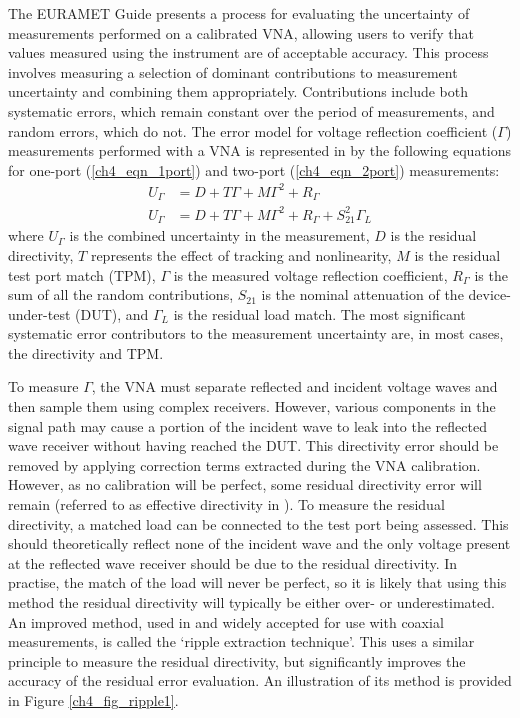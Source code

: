 \documentclass[../thesis/thesis.tex]{subfiles}
\begin{document}
The EURAMET Guide \cite{EURAMET_2011} presents a process for evaluating the uncertainty of measurements performed on a calibrated VNA, allowing users to verify that values measured using the instrument are of acceptable accuracy. This process involves measuring a selection of dominant contributions to measurement uncertainty and combining them appropriately. Contributions include both systematic errors, which remain constant over the period of measurements, and random errors, which do not.  The error model for voltage reflection coefficient ($\Gamma$) measurements performed with a VNA is represented in \cite{EURAMET_2011} by the following equations for one-port (\ref{ch4_eqn_1port}) and two-port (\ref{ch4_eqn_2port}) measurements:
\begin{align}
U_{\Gamma} &= D + T\Gamma + M\Gamma^2 + R_{\Gamma} \label{ch4_eqn_1port} \\
U_{\Gamma} &= D + T\Gamma + M\Gamma^2 + R_{\Gamma} + S_{21}^2\Gamma_L \label{ch4_eqn_2port}
\end{align}
where $U_{\Gamma}$ is the combined uncertainty in the measurement, $D$ is the residual directivity, $T$ represents the effect of tracking and nonlinearity, $M$ is the residual test port match (TPM), $\Gamma$ is the measured voltage reflection coefficient, $R_{\Gamma}$ is the sum of all the random contributions, $S_{21}$ is the nominal attenuation of the device-under-test (DUT), and $\Gamma_L$ is the residual load match. The most significant systematic error contributors to the measurement uncertainty are, in most cases, the directivity and TPM.

To measure $\Gamma$, the VNA must separate reflected and incident voltage waves and then sample them using complex receivers. However, various components in the signal path may cause a portion of the incident wave to leak into the reflected wave receiver without having reached the DUT. This directivity error should be removed by applying correction terms extracted during the VNA calibration. However, as no calibration will be perfect, some residual directivity error will remain (referred to as effective directivity in \cite{EURAMET_2011}). To measure the residual directivity, a matched load can be connected to the test port being assessed. This should theoretically reflect none of the incident wave and the only voltage present at the reflected wave receiver should be due to the residual directivity. In practise, the match of the load will never be perfect, so it is likely that using this method the residual directivity will typically be either over- or underestimated. An improved method, used in \cite{EURAMET_2011} and widely accepted for use with coaxial measurements, is called the ‘ripple extraction technique’. This uses a similar principle to measure the residual directivity, but significantly improves the accuracy of the residual error evaluation. An illustration of its method is provided in Figure \ref{ch4_fig_ripple1}.
\end{document}
